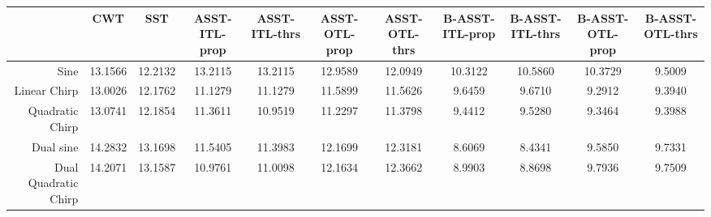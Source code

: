 \begin{tabular}{|r|c|c|c|c|c|c|c|c|c|c|}
\toprule
 & CWT & SST & ASST-ITL-prop & ASST-ITL-thrs & ASST-OTL-prop & ASST-OTL-thrs & B-ASST-ITL-prop & B-ASST-ITL-thrs & B-ASST-OTL-prop & B-ASST-OTL-thrs \\
\midrule
Sine & 13.1566 & 12.2132 & 13.2115 & 13.2115 & 12.9589 & 12.0949 & 10.3122 & 10.5860 & 10.3729 & 9.5009 \\
Linear Chirp & 13.0026 & 12.1762 & 11.1279 & 11.1279 & 11.5899 & 11.5626 & 9.6459 & 9.6710 & 9.2912 & 9.3940 \\
Quadratic Chirp & 13.0741 & 12.1854 & 11.3611 & 10.9519 & 11.2297 & 11.3798 & 9.4412 & 9.5280 & 9.3464 & 9.3988 \\
Dual sine & 14.2832 & 13.1698 & 11.5405 & 11.3983 & 12.1699 & 12.3181 & 8.6069 & 8.4341 & 9.5850 & 9.7331 \\
Dual Quadratic Chirp & 14.2071 & 13.1587 & 10.9761 & 11.0098 & 12.1634 & 12.3662 & 8.9903 & 8.8698 & 9.7936 & 9.7509 \\
\bottomrule
\end{tabular}
